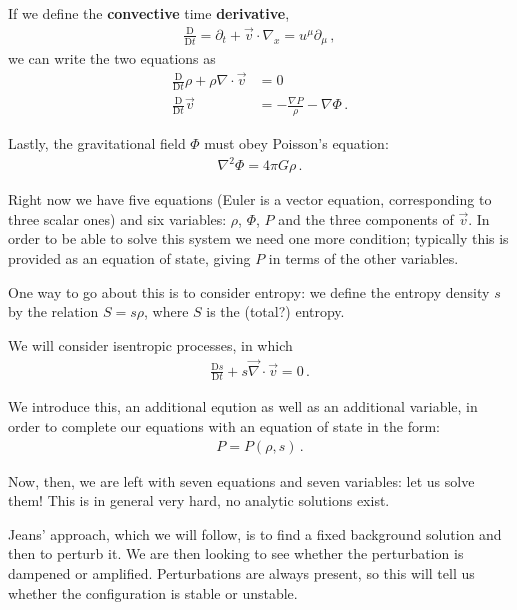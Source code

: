 \documentclass[main.tex]{subfiles}
\begin{document}
If we define the \textbf{convective} time \textbf{derivative},  
%
\begin{align}
  \frac{ \mathrm{D} }{\mathrm{D}t} = \partial_{t} + \vec{v} \cdot \nabla_{x} = u^{\mu } \partial_{\mu }
\,,
\end{align}
%
we can write the two equations as 
%
\begin{align}
  \frac{ \mathrm{D} }{\mathrm{D}t} \rho + \rho \nabla \cdot \vec{v} &= 0 \\
  \frac{ \mathrm{D} }{\mathrm{D}t} \vec{v} 
  &= - \frac{\nabla P}{\rho } - \nabla \Phi 
\,.
\end{align}

Lastly, the gravitational field \(\Phi \) must obey Poisson's equation:
%
\begin{align}
  \nabla^2 \Phi = 4 \pi G \rho 
\,.
\end{align}

Right now we have five equations (Euler is a vector equation, corresponding to three scalar ones) and six variables: \(\rho \), \(\Phi \), \(P\) and the three components of \(\vec{v}\). 
In order to be able to solve this system we need one more condition; typically this is provided as an equation of state, giving \(P\) in terms of the other variables. 

One way to go about this is to consider entropy: we define the entropy density \(s \) by the relation \(S  = s \rho \), where \(S\) is the (total?) entropy. 

We will consider isentropic processes, in which 
%
\begin{align}
  \frac{ \mathrm{D} s}{\mathrm{D}t} + s \vec{\nabla} \cdot \vec{v} = 0
\,.
\end{align}

We introduce this, an additional eqution as well as an additional variable, in order to complete our equations with an equation of state in the form: 
%
\begin{align}
P = P(\rho , s)
\,.
\end{align}

Now, then, we are left with seven equations and seven variables: let us solve them!
This is in general very hard, no analytic solutions exist.

Jeans' approach, which we will follow, is to find a fixed background solution and then to perturb it. 
We are then looking to see whether the perturbation is dampened or amplified. Perturbations are always present, so this will tell us whether the configuration is stable or unstable.
\end{document}
